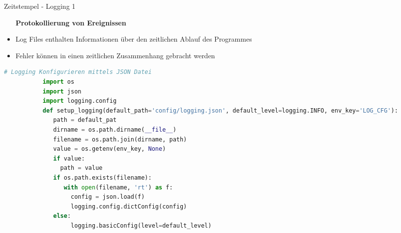 \begin{frame}[fragile]{Zeitstempel - Logging 1}
    \begin{itemize}
        \setlength{\itemindent}{1.9in}
        \item [\textbf{Protokollierung von Ereignissen}]
    \end{itemize}

    \begin{itemize}
              \item Log Files enthalten Informationen über den zeitlichen Ablauf des Programmes
               \item Fehler können in einen zeitlichen Zusammenhang gebracht werden
     \end{itemize}
     
    \begin{lstlisting}[language=Python, gobble=8]
        # Logging Konfigurieren mittels JSON Datei
           import os
           import json
           import logging.config
           def setup_logging(default_path='config/logging.json', default_level=logging.INFO, env_key='LOG_CFG'):
              path = default_pat
              dirname = os.path.dirname(__file__)
              filename = os.path.join(dirname, path)
              value = os.getenv(env_key, None)
              if value:
                path = value
              if os.path.exists(filename):
                 with open(filename, 'rt') as f:
                   config = json.load(f)
                   logging.config.dictConfig(config)
              else:
                   logging.basicConfig(level=default_level)    
        \end{lstlisting}
\end{frame}

